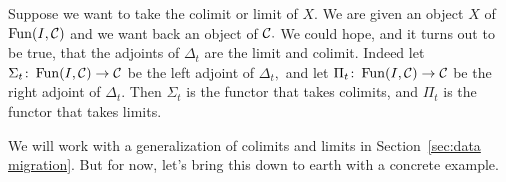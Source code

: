 \documentclass[../main/CT4S-EN-RU]{subfiles}
\begin{document}
\begin{blockRUS}
\end{blockRUS}

\begin{blockENG}
Suppose we want to take the colimit or limit of $X.$ We are given an object $X$ of $\operatorname{Fun}(I,\mathcal{C})$ and we want back an object of $\mathcal{C}.$ We could hope, and it turns out to be true, that the adjoints of $\Delta_t$ are the limit and colimit. Indeed let $\Sigma_t\colon\operatorname{Fun}(I,\mathcal{C})\rightarrow\mathcal{C}$ be the left adjoint of $\Delta_t,$ and let $\Pi_t\colon\operatorname{Fun}(I,\mathcal{C})\rightarrow\mathcal{C}$ be the right adjoint of $\Delta_t.$ Then $\Sigma_t$ is the functor that takes colimits, and $\Pi_t$ is the functor that takes limits.
\end{blockENG}

\begin{blockRUS}
\end{blockRUS}

\begin{blockENG}
We will work with a generalization of colimits and limits in Section~\ref{sec:data migration}. But for now, let's bring this down to earth with a concrete example.
\end{blockENG}

\begin{blockRUS}
\end{blockRUS}
\end{document}
